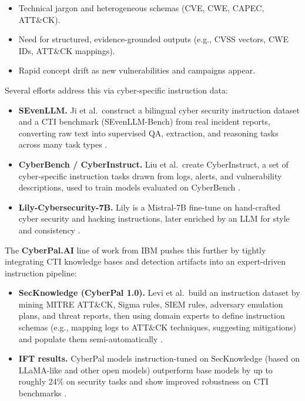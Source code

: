 \documentclass[unnumsec,webpdf,contemporary,large]{oup-authoring-template}
\theoremstyle{thmstyleone}
\theoremstyle{thmstyletwo}
\theoremstyle{thmstylethree}
\begin{document}
\begin{itemize}
  \item Technical jargon and heterogeneous schemas (CVE, CWE, CAPEC, ATT\&CK).
  \item Need for structured, evidence-grounded outputs (e.g., CVSS vectors, CWE IDs, ATT\&CK mappings).
  \item Rapid concept drift as new vulnerabilities and campaigns appear.
\end{itemize}

Several efforts address this via cyber-specific instruction data:

\begin{itemize}
  \item \textbf{SEvenLLM.} Ji et al.\ construct a bilingual cyber security instruction dataset and a CTI benchmark (SEvenLLM-Bench) from real incident reports, converting raw text into supervised QA, extraction, and reasoning tasks across many task types \cite{ji2024sevenllm}.
  \item \textbf{CyberBench / CyberInstruct.} Liu et al.\ create CyberInstruct, a set of cyber-specific instruction tasks drawn from logs, alerts, and vulnerability descriptions, used to train models evaluated on CyberBench \cite{liu2024cyberbench}.
  \item \textbf{Lily-Cybersecurity-7B.} Lily is a Mistral-7B fine-tune on hand-crafted cyber security and hacking instructions, later enriched by an LLM for style and consistency \cite{liu2024cyberbench}.
\end{itemize}

The \textbf{CyberPal.AI} line of work from IBM pushes this further by tightly integrating CTI knowledge bases and detection artifacts into an expert-driven instruction pipeline:

\begin{itemize}
  \item \textbf{SecKnowledge (CyberPal 1.0).} Levi et al.\ build an instruction dataset by mining MITRE ATT\&CK, Sigma rules, SIEM rules, adversary emulation plans, and threat reports, then using domain experts to define instruction schemas (e.g., mapping logs to ATT\&CK techniques, suggesting mitigations) and populate them semi-automatically \cite{levi2024cyberpal}.
  \item \textbf{IFT results.} CyberPal models instruction-tuned on SecKnowledge (based on LLaMA-like and other open models) outperform base models by up to roughly 24\% on security tasks and show improved robustness on CTI benchmarks \cite{levi2024cyberpal}.
\end{itemize}
\end{document}
